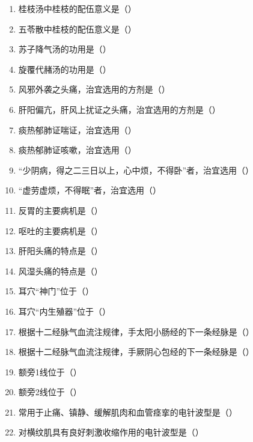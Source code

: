 \documentclass[a4paper,11pt]{ctexart}
\begin{document}
\begin{enumerate}[resume]
      \item 桂枝汤中桂枝的配伍意义是（\quad）
      \item 五苓散中桂枝的配伍意义是（\quad）
      \item 苏子降气汤的功用是（\quad）
      \item 旋覆代赭汤的功用是（\quad）
      \item 风邪外袭之头痛，治宜选用的方剂是（\quad）
      \item 肝阳偏亢，肝风上扰证之头痛，治宜选用的方剂是（\quad）
      \item 痰热郁肺证喘证，治宜选用（\quad）
      \item 痰热郁肺证咳嗽，治宜选用（\quad）
      \item “少阴病，得之二三日以上，心中烦，不得卧”者，治宜选用（\quad）
      \item “虚劳虚烦，不得眠”者，治宜选用（\quad）
      \item 反胃的主要病机是（\quad）
      \item 呕吐的主要病机是（\quad）
      \item 肝阳头痛的特点是（\quad）
      \item 风湿头痛的特点是（\quad）
      \item 耳穴“神门”位于（\quad）
      \item 耳穴“内生殖器”位于（\quad）
      \item 根据十二经脉气血流注规律，手太阳小肠经的下一条经脉是（\quad）
      \item 根据十二经脉气血流注规律，手厥阴心包经的下一条经脉是（\quad）
      \item 额旁1线位于（\quad）
      \item 额旁2线位于（\quad）
      \item 常用于止痛、镇静、缓解肌肉和血管痉挛的电针波型是（\quad）
      \item 对横纹肌具有良好刺激收缩作用的电针波型是（\quad）
\end{enumerate}
\end{document}
